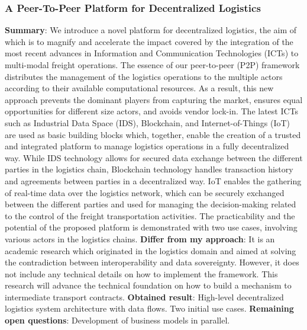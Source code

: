 \subsubsection{A Peer-To-Peer Platform for Decentralized Logistics \cite{peer-to-peerDecentralizedLogistics}}
\textbf{Summary}: We introduce a novel platform for decentralized logistics, the aim of which is to magnify and accelerate the impact covered by the integration of the most recent advances in Information and Communication Technologies (ICTs) to multi-modal freight operations. The essence of our peer-to-peer (P2P) framework distributes the management of the logistics operations to the multiple actors according to their available computational resources. As a result, this new approach prevents the dominant players from capturing the market, ensures equal opportunities for different size actors, and avoids vendor lock-in. The latest ICTs such as Industrial Data Space (IDS), Blockchain, and Internet-of-Things (IoT) are used as basic building blocks which, together, enable the creation of a trusted and integrated platform to manage logistics operations in a fully decentralized way. While IDS technology allows for secured data exchange between the different parties in the logistics chain, Blockchain technology handles transaction history and agreements between parties in a decentralized way. IoT enables the gathering of real-time data over the logistics network, which can be securely exchanged between the different parties and used for managing the decision-making related to the control of the freight transportation activities. The practicability and the potential of the proposed platform is demonstrated with two use cases, involving various actors in the logistics chains.\newline
\textbf{Differ from my approach}: It is an academic research which originated in the logistics domain and aimed at solving the contradiction between interoperability and data sovereignty. However, it does not include any technical details on how to implement the framework. This research will advance the technical foundation on how to build a mechanism to intermediate transport contracts.\newline
\textbf{Obtained result}: High-level decentralized logistics system architecture with data flows. Two initial use cases.\newline
\textbf{Remaining open questions}: Development of business models in parallel.\newline
